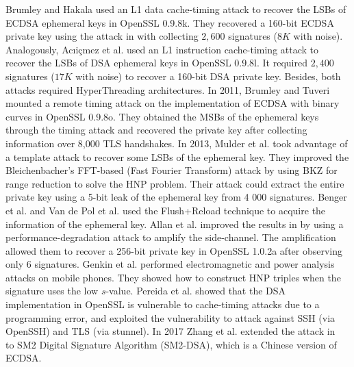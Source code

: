 Brumley and Hakala \cite{Brumley2009} used an L1 data cache-timing attack to recover the LSBs of ECDSA ephemeral keys in OpenSSL 0.9.8k.
 They recovered a 160-bit ECDSA private key using the attack in \cite{HG2001} with collecting $2,600$ signatures ($8K$ with noise).
Analogously, Ac{\i}i{\c{c}}mez et al. \cite{Brumley2010} used an L1 instruction cache-timing attack to recover the LSBs of DSA ephemeral keys in OpenSSL 0.9.8l.
 It required $2,400$ signatures ($17K$ with noise) to recover a 160-bit DSA private key.
 Besides, both attacks required HyperThreading architectures.
In 2011, Brumley and Tuveri \cite{Brumley2011} mounted a remote timing attack on the implementation of ECDSA with binary curves in OpenSSL 0.9.8o.
 They obtained the MSBs of the ephemeral keys through the timing attack and recovered the private key after collecting information over 8,000 TLS handshakes.
In 2013, Mulder et al. \cite{Mulder2013} took advantage of a template attack to recover some LSBs of the ephemeral key.
They improved the Bleichenbacher’s FFT-based (Fast Fourier Transform) attack by using BKZ for range reduction to solve the HNP problem.
Their attack could extract the entire private key using a 5-bit leak of the ephemeral key from 4 000 signatures.
Benger et al. \cite{Benger2014} and Van de Pol et al. \cite{Van2015} used the Flush+Reload technique to acquire the information of the ephemeral key.
Allan et al. \cite{Allan2016} improved the  results in \cite{Van2015} by using a performance-degradation attack to amplify the side-channel. The amplification allowed them to recover a 256-bit private key in OpenSSL 1.0.2a after observing only 6 signatures.
Genkin et al. \cite{Genkin2016} performed electromagnetic and power analysis attacks on mobile phones.
 They showed how to construct HNP triples when the signature uses the low $s$-value.
Pereida et al. \cite{Pereida2016} showed that the DSA implementation in OpenSSL is vulnerable to cache-timing attacks due to a programming error,
 and exploited the vulnerability to attack against SSH (via OpenSSH) and TLS (via stunnel).
In 2017 Zhang et al. \cite{Zhang2017} extended  the attack in ~\cite{Nguyen2003} to SM2 Digital Signature Algorithm (SM2-DSA), which is a Chinese version of ECDSA.



